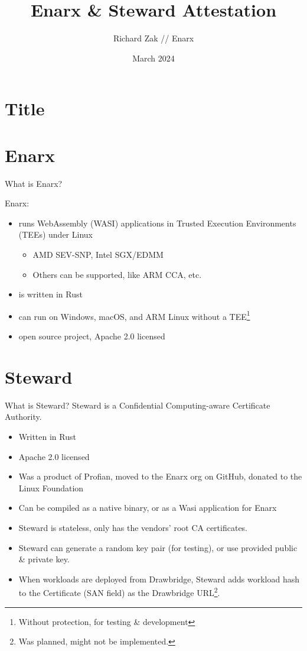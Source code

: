 \documentclass[graphics,compress]{beamer}
\title{Enarx \& Steward Attestation}
\author{Richard Zak // Enarx}
\date{March 2024}
\begin{document}
\section*{Title}
\begin{frame}
\maketitle
\end{frame}

\frame{\tableofcontents}

\section{Enarx}
\begin{frame}{What is Enarx?}

Enarx:
\begin{itemize}
\item runs WebAssembly (WASI) applications in Trusted Execution Environments (TEEs) under Linux
\begin{itemize}
\item AMD SEV-SNP, Intel SGX/EDMM
\item Others can be supported, like ARM CCA, etc.
\end{itemize}
\item is written in Rust
\item can run on Windows, macOS, and ARM Linux without a TEE\footnote{Without protection, for testing \& development}
\item open source project, Apache 2.0 licensed
\end{itemize}

\end{frame}

\section{Steward}
\begin{frame}{What is Steward?}
Steward is a Confidential Computing-aware Certificate Authority.
\begin{itemize}
    \item Written in Rust
    \item Apache 2.0 licensed
    \item Was a product of Profian, moved to the Enarx org on GitHub, donated to the Linux Foundation
    \item Can be compiled as a native binary, or as a Wasi application for Enarx
    \item Steward is stateless, only has the vendors' root CA certificates.
    \item Steward can generate a random key pair (for testing), or use provided public \& private key.
    \item When workloads are deployed from Drawbridge, Steward adds workload hash to the Certificate (SAN field) as the Drawbridge URL\footnote{Was planned, might not be implemented.}.
\end{itemize}
\end{frame}
\end{document}
